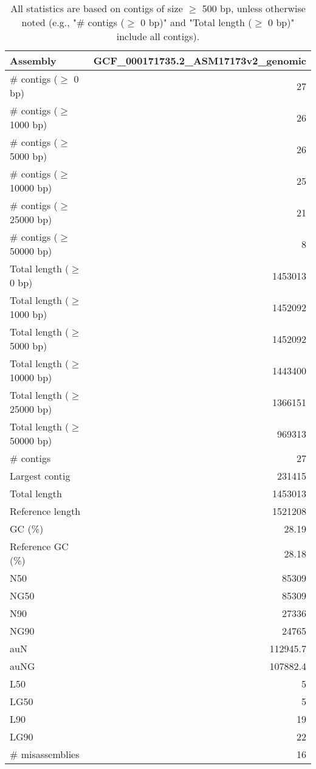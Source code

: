 \documentclass[12pt,a4paper]{article}
\begin{document}
\begin{table}[ht]
\begin{center}
\caption{All statistics are based on contigs of size $\geq$ 500 bp, unless otherwise noted (e.g., "\# contigs ($\geq$ 0 bp)" and "Total length ($\geq$ 0 bp)" include all contigs).}
\begin{tabular}{|l*{1}{|r}|}
\hline
Assembly & GCF\_000171735.2\_ASM17173v2\_genomic \\ \hline
\# contigs ($\geq$ 0 bp) & 27 \\ \hline
\# contigs ($\geq$ 1000 bp) & 26 \\ \hline
\# contigs ($\geq$ 5000 bp) & 26 \\ \hline
\# contigs ($\geq$ 10000 bp) & 25 \\ \hline
\# contigs ($\geq$ 25000 bp) & 21 \\ \hline
\# contigs ($\geq$ 50000 bp) & 8 \\ \hline
Total length ($\geq$ 0 bp) & 1453013 \\ \hline
Total length ($\geq$ 1000 bp) & 1452092 \\ \hline
Total length ($\geq$ 5000 bp) & 1452092 \\ \hline
Total length ($\geq$ 10000 bp) & 1443400 \\ \hline
Total length ($\geq$ 25000 bp) & 1366151 \\ \hline
Total length ($\geq$ 50000 bp) & 969313 \\ \hline
\# contigs & 27 \\ \hline
Largest contig & 231415 \\ \hline
Total length & 1453013 \\ \hline
Reference length & 1521208 \\ \hline
GC (\%) & 28.19 \\ \hline
Reference GC (\%) & 28.18 \\ \hline
N50 & 85309 \\ \hline
NG50 & 85309 \\ \hline
N90 & 27336 \\ \hline
NG90 & 24765 \\ \hline
auN & 112945.7 \\ \hline
auNG & 107882.4 \\ \hline
L50 & 5 \\ \hline
LG50 & 5 \\ \hline
L90 & 19 \\ \hline
LG90 & 22 \\ \hline
\# misassemblies & 16 \\ \hline

\end{tabular}
\end{center}
\end{table}
\end{document}
